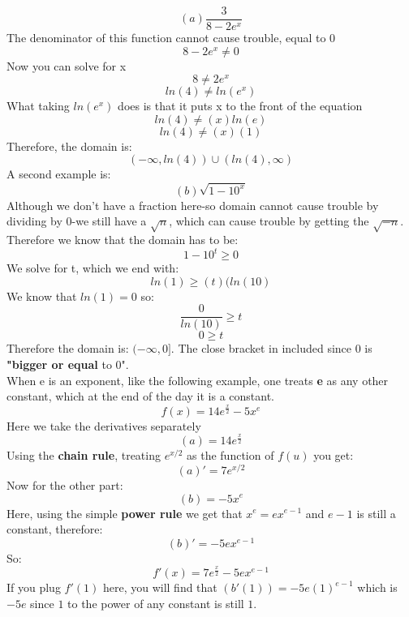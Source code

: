 \documentclass[12pt, letterpaper]{article}
\begin{document}
\[(a)\frac{3}{8-2e^x}\]
The denominator of this function cannot cause trouble, equal to 0
\[8-2e^x \neq 0\]
Now you can solve for x
\[8 \neq 2e^x\]
\[ln(4)\neq ln(e^x)\]
What taking \(ln(e^x)\) does is that it puts x to the front of the equation
\[ln(4)\neq (x)ln(e)\]
\[ln(4) \neq (x)(1)\]
Therefore, the domain is:
\[(-\infty,ln(4)) \cup (ln(4),\infty)\]
A second example is:
\[(b) \sqrt{1-10^x}\]
Although we don't have a fraction here-so domain cannot cause trouble by dividing by 0-we still have a \(\sqrt{n}\), which can cause trouble by getting the \(\sqrt{-n}\). Therefore we know that the domain has to be:
\[1-10^t \geq 0\]
We solve for t, which we end with:
\[ln(1) \geq (t)(ln(10)\]
We know that \(ln(1) = 0\) so:
\[\frac{0}{ln(10)} \geq t\]
\[0 \geq t\]
Therefore the domain is: \((-\infty,0]\). The close bracket in included since 0 is \textbf{"bigger or equal} to 0".\\
\newline
When e is an exponent, like the following example, one treats \textbf{e} as any other constant, which at the end of the day it is a constant.
\[f(x) = 14e^{\frac{x}{2}} - 5x^e\]
Here we take the derivatives separately
\[(a) = 14e^{\frac{x}{2}}\]
Using the \textbf{chain rule}, treating \(e^{x/2}\) as the function of \(f(u)\) you get:
\[(a)' = 7e^{x/2}\]
Now for the other part:
\[(b) = -5x^e\]
Here, using the simple \textbf{power rule} we get that \(x^e = ex^{e-1}\) and \(e-1\) is still a constant, therefore:
\[(b)' = -5ex^{e-1}\]
So:
\[f'(x) = 7e^{\frac{x}{2}}-5ex^{e-1}\]
If you plug \(f'(1)\) here, you will find that \((b'(1)) = -5e(1)^{e-1}\) which is \(-5e\) since \(1\) to the power of any constant is still \(1\).
\end{document}
